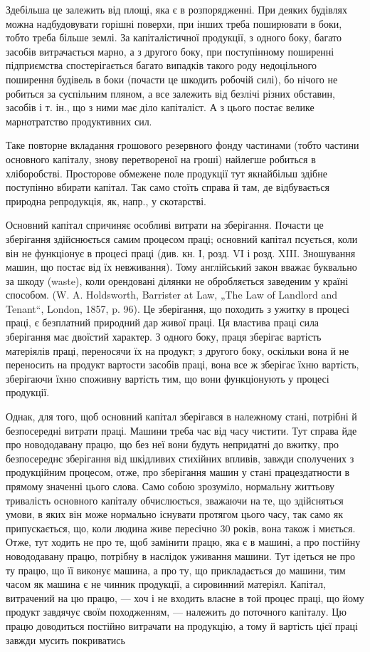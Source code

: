 Здебільша це залежить від площі, яка є в розпорядженні. При деяких будівлях можна надбудовувати
горішні поверхи, при інших треба поширювати в боки, тобто треба більше землі. За капіталістичної
продукції, з одного боку, багато засобів витрачається марно, а з другого боку, при поступінному
поширенні підприємства спостерігається багато випадків такого роду недоцільного поширення будівель в
боки (почасти це шкодить робочій силі), бо нічого не робиться за суспільним пляном, а все залежить
від безлічі різних обставин, засобів і т. ін., що з ними має діло капіталіст. А з цього постає
велике марнотратство продуктивних сил.

Таке повторне вкладання грошового резервного фонду частинами (тобто частини основного капіталу,
знову перетвореної на гроші) найлегше робиться в хліборобстві. Просторове обмежене поле продукції
тут якнайбільш здібне поступінно вбирати капітал. Так само стоїть справа й там, де відбувається
природна репродукція, як, напр., у скотарстві.

Основний капітал спричиняє особливі витрати на зберігання. Почасти це зберігання здійснюється самим
процесом праці; основний капітал псується, коли він не функціонує в процесі праці (див. кн. І, розд.
VI і розд. XIII. Зношування машин, що постає від їх невживання). Тому англійський закон вважає
буквально за шкоду (waste), коли орендовані ділянки не обробляється заведеним у країні способом. (W.
A. Holdsworth, Barrister at Law, „The Law of Landlord and Tenant“, London, 1857, p. 96). Це
зберігання, що походить з ужитку в процесі праці, є безплатний природний дар живої праці. Ця
властива праці сила зберігання має двоїстий характер. З одного боку, праця зберігає вартість
матеріялів праці, переносячи їх на продукт; з другого боку, оскільки вона й не переносить на продукт
вартости засобів праці, вона все ж зберігає їхню вартість, зберігаючи їхню споживну вартість тим, що
вони функціонують у процесі продукції.

Однак, для того, щоб основний капітал зберігався в належному стані, потрібні й безпосередні витрати
праці. Машини треба час від часу чистити. Тут справа йде про новододавану працю, що без неї вони
будуть непридатні до вжитку, про безпосереднє зберігання від шкідливих стихійних впливів, завжди
сполучених з продукційним процесом, отже, про зберігання машин у стані працездатности в прямому
значенні цього слова. Само собою зрозуміло, нормальну життьову тривалість основного капіталу
обчислюється, зважаючи на те, що здійсняться умови, в яких він може нормально існувати протягом
цього часу, так само як припускається, що, коли людина живе пересічно 30 років, вона також і
миється. Отже, тут ходить не про те, щоб замінити працю, яка є в машині, а про постійну новододавану
працю, потрібну в наслідок уживання машини. Тут ідеться не про ту працю, що її виконує машина, а про
ту, що прикладається до машини, тим часом як машина є не чинник продукції, а сировинний
матеріял. Капітал, витрачений на цю працю, — хоч і не входить власне в той процес праці, що йому
продукт завдячує своїм походженням, — належить до поточного капіталу. Цю працю доводиться постійно
витрачати на продукцію, а тому й вартість цієї праці завжди мусить покриватись
\parbreak{}  %
